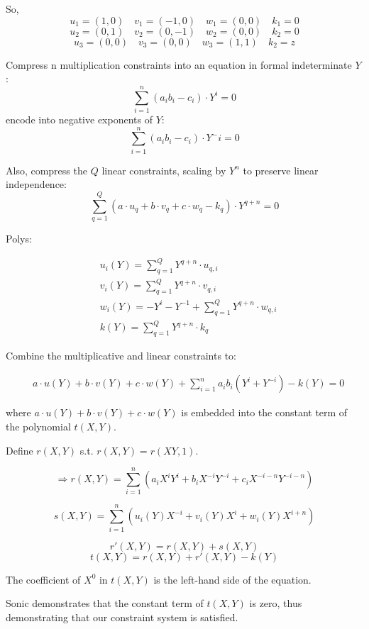\documentclass{article}
\theoremstyle{definition}
\begin{document}
So,
$$u_1 = (1, 0) \quad v_1=(-1, 0) \quad w_1=(0, 0) \quad k_1=0$$
$$u_2 = (0, 1) \quad v_2=(0, -1) \quad w_2=(0, 0) \quad k_2=0$$
$$u_3 = (0, 0) \quad v_3=(0, 0) \quad w_3=(1, 1) \quad k_2=z$$

\vspace{1cm}

Compress n multiplication constraints into an equation in formal indeterminate $Y$:
$$\sum_{i=1}^n (a_i b_i - c_i) \cdot Y^i = 0$$
encode into negative exponents of $Y$:
$$\sum_{i=1}^n (a_i b_i - c_i) \cdot Y^-i = 0$$

Also, compress the $Q$ linear constraints, scaling by $Y^n$ to preserve linear independence:
$$
\sum_{q=1}^Q (a \cdot u_q + b \cdot v_q + c \cdot w_q - k_q) \cdot Y^{q+n} = 0
$$

Polys:

\begin{align}
\nonumber & u_i(Y) = \sum_{q=1}^Q Y^{q+n} \cdot u_{q, i}\\
\nonumber & v_i(Y) = \sum_{q=1}^Q Y^{q+n} \cdot v_{q, i}\\
\nonumber & w_i(Y) = -Y^i - Y^{-1} + \sum_{q=1}^Q Y^{q+n} \cdot w_{q, i}\\
\nonumber & k(Y) = \sum_{q=1}^Q Y^{q+n} \cdot k_q
\end{align}

Combine the multiplicative and linear constraints to:

\begin{align}
\nonumber & a \cdot u(Y) + b \cdot v(Y) + c \cdot w(Y)
+ \sum_{i=1}^n a_i b_i (Y^i + Y^{-i}) - k(Y) = 0
\end{align}

where $a \cdot u(Y) + b \cdot v(Y) + c \cdot w(Y)$ is embedded into the constant term of the polynomial $t(X, Y)$.


Define $r(X, Y)$ s.t. $r(X, Y) = r(XY, 1)$.

$$\Longrightarrow r(X, Y) = \sum_{i=1}^n (a_i X^i Y^i + b_i X^{-i} Y^{-i} + c_i X^{-i-n} Y^{-i-n})$$

$$s(X, Y) = \sum_{i=1}^n (u_i(Y) X^{-i} + v_i(Y) X^i + w_i(Y) X^{i+n})$$

$$r'(X, Y) = r(X, Y) + s(X, Y)$$
$$t(X, Y) = r(X, Y) + r'(X, Y) - k(Y)$$

The coefficient of $X^0$ in $t(X, Y)$ is the left-hand side of the equation.

Sonic demonstrates that the constant term of $t(X, Y)$ is zero, thus demonstrating that our constraint system is satisfied.
\end{document}
